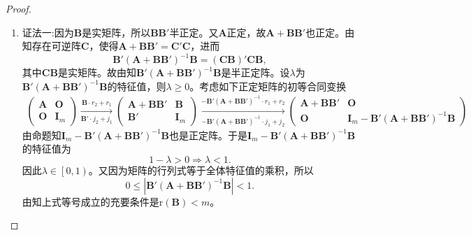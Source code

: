 \documentclass[../../main.tex]{subfiles}%
\begin{document}
\begin{proof}
\begin{enumerate}[(1)]
\item {\color{blue}证法一:}因为$\boldsymbol{B}$是实矩阵，所以$\boldsymbol{BB}'$半正定。又$\boldsymbol{A}$正定，故$\boldsymbol{A}+\boldsymbol{BB}'$也正定。由知存在可逆阵$\boldsymbol{C}$，使得$\boldsymbol{A}+\boldsymbol{BB}'=\boldsymbol{C}'\boldsymbol{C}$，进而
$$\boldsymbol{B}'\left( \boldsymbol{A}+\boldsymbol{BB}' \right) ^{-1}\boldsymbol{B}=\left( \boldsymbol{CB} \right) '\boldsymbol{CB},$$
其中$\boldsymbol{CB}$是实矩阵。故由知$\boldsymbol{B}'\left( \boldsymbol{A}+\boldsymbol{BB}' \right) ^{-1}\boldsymbol{B}$是半正定阵。设$\lambda$为$\boldsymbol{B}'\left( \boldsymbol{A}+\boldsymbol{BB}' \right) ^{-1}\boldsymbol{B}$的特征值，则$\lambda \geqslant 0$。考虑如下正定矩阵的初等合同变换
\begin{align*}
\begin{pmatrix} 
\boldsymbol{A} & \boldsymbol{O} \\ 
\boldsymbol{O} & \boldsymbol{I}_m 
\end{pmatrix} 
\xrightarrow[\boldsymbol{B}' \cdot j_2 + j_1]{\boldsymbol{B} \cdot r_2 + r_1} 
\begin{pmatrix} 
\boldsymbol{A} + \boldsymbol{BB}' & \boldsymbol{B} \\ 
\boldsymbol{B}' & \boldsymbol{I}_m 
\end{pmatrix} 
\xrightarrow[-\boldsymbol{B}'(\boldsymbol{A} + \boldsymbol{BB}')^{-1} \cdot j_1 + j_2]{-\boldsymbol{B}'(\boldsymbol{A} + \boldsymbol{BB}')^{-1} \cdot r_1 + r_2} 
\begin{pmatrix} 
\boldsymbol{A} + \boldsymbol{BB}' & \boldsymbol{O} \\ 
\boldsymbol{O} & \boldsymbol{I}_m - \boldsymbol{B}'(\boldsymbol{A} + \boldsymbol{BB}')^{-1}\boldsymbol{B} 
\end{pmatrix}
\end{align*}
由命题知$\boldsymbol{I}_m-\boldsymbol{B}'\left( \boldsymbol{A}+\boldsymbol{BB}' \right) ^{-1}\boldsymbol{B}$也是正定阵。于是$\boldsymbol{I}_m-\boldsymbol{B}'\left( \boldsymbol{A}+\boldsymbol{BB}' \right) ^{-1}\boldsymbol{B}$的特征值为
$$1-\lambda >0\Longrightarrow \lambda <1.$$
因此$\lambda \in \left[ 0,1 \right)$。又因为矩阵的行列式等于全体特征值的乘积，所以
$$0\leqslant \left| \boldsymbol{B}'\left( \boldsymbol{A}+\boldsymbol{BB}' \right) ^{-1}\boldsymbol{B} \right|<1.$$
由知上式等号成立的充要条件是$\mathrm{r}\left( \boldsymbol{B} \right) <m$。


\end{enumerate}
\end{proof}
\end{document}
